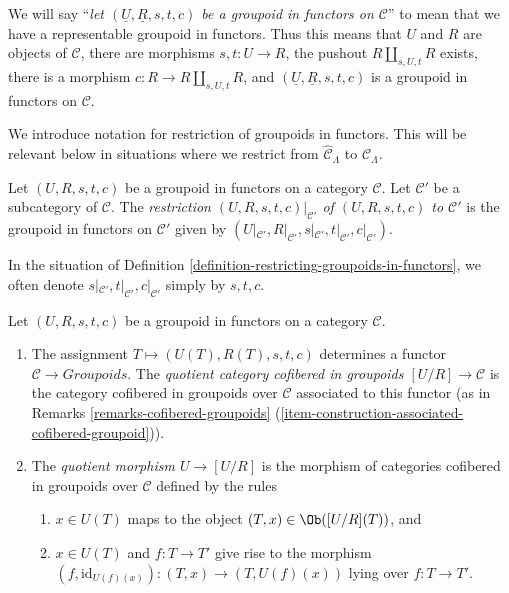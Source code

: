\begin{remark}
\label{remark-simplify-terminology}
We will say ``{\it let $(\underline{U}, \underline{R}, s, t, c)$ be a
groupoid in functors on $\mathcal{C}$}'' to mean that we have
a representable groupoid in functors. Thus this means that
$U$ and $R$ are objects of $\mathcal{C}$, there are morphisms
$s, t : U \to R$, the pushout $R \amalg_{s, U, t} R$ exists,
there is a morphism $c : R \to R \amalg_{s, U, t} R$, and
$(\underline{U}, \underline{R}, s, t, c)$ is a
groupoid in functors on $\mathcal{C}$.
\end{remark}

\noindent
We introduce notation for restriction of groupoids in functors. This will be
relevant below in situations where we restrict from $\widehat{\mathcal
C}_\Lambda$ to $\mathcal{C}_\Lambda$.

\begin{definition}
\label{definition-restricting-groupoids-in-functors}
Let $(U, R, s, t, c)$ be a groupoid in functors on a category $\mathcal{C}$.
Let $\mathcal{C}'$ be a subcategory of $\mathcal{C}$. The
{\it restriction $(U, R, s, t, c)|_{\mathcal{C}'}$ of $(U, R, s, t, c)$
to $\mathcal{C}'$} is the groupoid
in functors on $\mathcal{C}'$ given by $(U|_{\mathcal{C}'}, R|_{\mathcal
C'}, s|_{\mathcal{C}'}, t|_{\mathcal{C}'}, c|_{\mathcal{C}'})$.
\end{definition}

\begin{remark}
\label{remark-notation-restriction}
In the situation of Definition
\ref{definition-restricting-groupoids-in-functors}, we often denote
$s|_{\mathcal{C}'}, t|_{\mathcal{C}'}, c|_{\mathcal{C}'}$ simply by $s, t, c$.
\end{remark}

\begin{definition}
\label{definition-quotient}
Let $(U, R, s, t, c)$ be a groupoid in functors on a category $\mathcal{C}$.
\begin{enumerate}
\item The assignment $T \mapsto  (U(T), R(T), s, t, c)$ determines a functor
$\mathcal{C} \to \textit{Groupoids}$. The {\it quotient category
cofibered in groupoids $[U/R] \to \mathcal{C}$} is the category
cofibered in groupoids over $\mathcal{C}$ associated to this functor (as in
Remarks \ref{remarks-cofibered-groupoids}
(\ref{item-construction-associated-cofibered-groupoid})).
\item The {\it quotient morphism $U \to [U/R]$} is the morphism of
categories cofibered in groupoids over $\mathcal{C}$ defined by the
rules
\begin{enumerate}
\item $x \in U(T)$ maps to the object $(T, x) \in \Ob([U/R](T))$, and
\item $x \in U(T)$ and $f : T \to T'$ give rise to the morphism
$(f, \text{id}_{U(f)(x)}): (T, x) \to (T, U(f)(x))$ lying over
$f : T \to T'$.
\end{enumerate}
\end{enumerate}
\end{definition}





